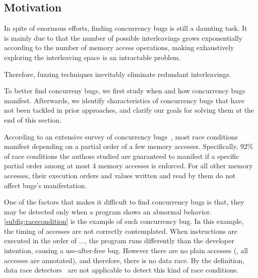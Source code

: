 \subsection{Motivation}
\label{ss:motivation}

In spite of enormous efforts, finding concurrency bugs is still a
daunting task.
%
It is mainly due to that the number of possible interleavings grows
exponentially according to the number of memory access operations,
making exhaustively exploring the interleaving space is an intractable
problem.



%
Therefore, fuzzing techniques inevitably eliminate redundant
interleavings.






%
To better find concurreny bugs, we first study when and how
concurrency bugs manifest.
%
Afterwards, we identify characteristics of concurrency bugs that have
not been tackled in prior approaches, and clarify our goals for
solving them at the end of this section.



%
According to an extensive survey of concurrency
bugs~\cite{learningfrommistakes}, most race conditions manifest
depending on a partial order of a few memory accesses.
%
Specifically, 92\% of race conditions the authors studied are
guaranteed to manifest if a specific partial order among at most 4
memory accesses is enforced.
%
For all other memory accesses, their execution orders and values
written and read by them do not affect bugs's manifestation.


One of the factors that makes it difficult to find concurrency bugs is
that, they may be detected only when a program shows an abnormal
behavior.
%
\autoref{subfig:racecondition} is the example of such concurrency bug.
%
In this example, the timing of accesses are not correctly
contemplated. When instructions are executed in the order of
..., the program runs differently than the developer
intention, causing a use-after-free bug.
%
However there are no plain accesses (\ie, all accesses are annotated),
and therefore, there is no data race.
%
By the definition, data race detectors~\cite{tsan, kcsan, krace,
  prorace, txrace, crsampler} are not applicable to detect this kind
of race conditions.



